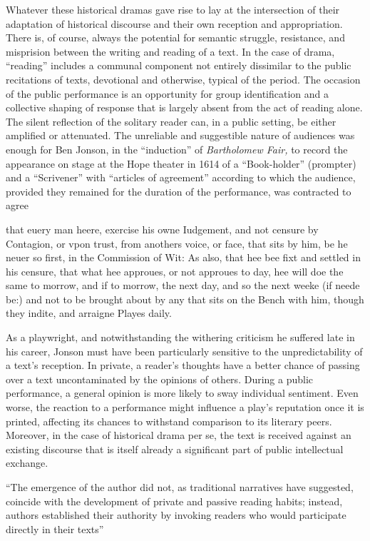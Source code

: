 Whatever these historical dramas gave rise to lay at the intersection of their adaptation of historical discourse  and their own reception and appropriation. There is, of course, always the potential for semantic struggle, resistance, and misprision between the writing and reading of a text. In the case of drama, ``reading'' includes a communal component not entirely dissimilar to the public recitations of texts, devotional and otherwise, typical of the period. The occasion of the public performance is an opportunity for group identification and a collective shaping of response that is largely absent from the act of reading alone. The silent reflection of the solitary reader can, in a public setting, be either amplified or attenuated. The unreliable and suggestible nature of audiences was enough for Ben Jonson, in the ``induction'' of \emph{Bartholomew Fair,} to record the appearance on stage at the Hope theater in 1614 of a ``Book-holder'' (prompter) and a ``Scrivener'' with ``articles of agreement'' according to which the audience, provided they remained for the duration of the performance, was contracted to agree
\begin{bq}
that euery man heere, exercise his owne Iudgement, and not censure by Contagion, or vpon trust, from anothers voice, or face, that sits by him, be he neuer so first, in the Commission of Wit: As also, that hee bee fixt and settled in his censure, that what hee approues, or not approues to day, hee will doe the same to morrow, and if to morrow, the next day, and so the next weeke (if neede be:) and not to be brought about by any that sits on the Bench with him, though they indite, and arraigne Playes daily.~\cite[sig. A5v]{jonson_bartholmew_1631}
\end{bq}
As a playwright, and notwithstanding the withering criticism he suffered late in his career, Jonson must have been particularly sensitive to the unpredictability of a text's reception. In private, a reader's thoughts have a better chance of passing over a text uncontaminated by the opinions of others. During a public performance, a general opinion is more likely to sway individual sentiment. Even worse, the reaction to a performance might influence a play's reputation once it is printed, affecting its chances to withstand comparison to its literary peers. Moreover, in the case of historical drama per se, the text is received against an existing discourse that is itself already a significant part of public intellectual exchange.

``The emergence of the author did not, as traditional narratives have suggested, coincide with the development of private and passive reading habits; instead, authors established their authority by invoking readers who would participate directly in their texts''~\cite[22]{dobranski_readers_2005}

